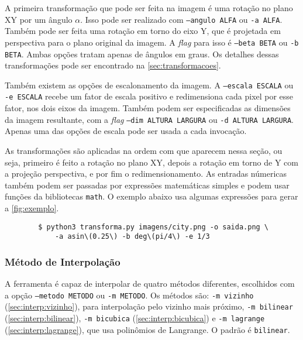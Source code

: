     A primeira transformação que pode ser feita na imagem é uma rotação no plano XY por um ângulo $\alpha$. Isso pode ser realizado com \texttt{--angulo ALFA} ou \texttt{-a ALFA}. Também pode ser feita uma rotação em torno do eixo Y, que é projetada em perspectiva para o plano original da imagem. A \textit{flag} para isso é \texttt{--beta BETA} ou \texttt{-b BETA}. Ambas opções tratam apenas de ângulos em graus. Os detalhes dessas transformações pode ser encontrado na \cref{sec:transformacoes}.


    Também existem as opções de escalonamento da imagem. A \texttt{--escala ESCALA} ou \texttt{-e ESCALA} recebe um fator de escala positivo e redimensiona cada pixel por esse fator, nos dois eixos da imagem. Também podem ser especificadas as dimensões da imagem resultante, com a \textit{flag} \texttt{--dim ALTURA LARGURA} ou \texttt{-d ALTURA LARGURA}. Apenas uma das opções de escala pode ser usada a cada invocação.

    As transformações são aplicadas na ordem com que aparecem nessa seção, ou seja, primeiro é feito a rotação no plano XY, depois a rotação em torno de Y com a projeção perspectiva, e por fim o redimensionamento. As entradas númericas também podem ser passadas por expressões matemáticas simples e podem usar funções da bibliotecas \texttt{math}. O exemplo abaixo usa algumas expressões para gerar a \cref{fig:exemplo}.

    \begin{verbatim}
        $ python3 transforma.py imagens/city.png -o saida.png \
            -a asin\(0.25\) -b deg\(pi/4\) -e 1/3
    \end{verbatim}

\subsubsection{Método de Interpolação}

    A ferramenta é capaz de interpolar de quatro métodos diferentes, escolhidos com a opção \texttt{--metodo METODO} ou \texttt{-m METODO}. Os métodos são: \texttt{-m vizinho} (\cref{sec:interp:vizinho}), para interpolação pelo vizinho mais próximo, \texttt{-m bilinear} (\ref{sec:interp:bilinear}), \texttt{-m bicubica} (\ref{sec:interp:bicubica}) e \texttt{-m lagrange} (\ref{sec:interp:lagrange}), que usa polinômios de Langrange. O padrão é \texttt{bilinear}.

